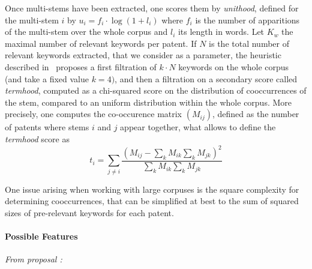 Once multi-stems have been extracted, one scores them by \emph{unithood}, defined for the multi-stem $i$ by $u_i = f_i\cdot \log{(1 + l_i)}$ where $f_i$ is the number of apparitions of the multi-stem over the whole corpus and $l_i$ its length in words. Let $K_w$ the maximal number of relevant keywords per patent. If $N$ is the total number of relevant keywords extracted, that we consider as a parameter, the heuristic described in~\cite{chavalarias2013phylomemetic} proposes a first filtration of $k\cdot N$ keywords on the whole corpus (and take a fixed value $k=4)$, and then a filtration on a secondary score called \emph{termhood}, computed as a chi-squared score on the distribution of cooccurrences of the stem, compared to an uniform distribution within the whole corpus. More precisely, one computes the co-occurence matrix $(M_{ij})$, defined as the number of patents where stems $i$ and $j$ appear together, what allows to define the \emph{termhood} score as
\[
t_i = \sum_{j\neq i}\frac{\left( M_{ij} - \sum_{k}M_{ik} \sum_{k} M_{jk}\right)^2}{\sum_{k}M_{ik} \sum_{k} M_{jk}}
\]

One issue arising when working with large corpuses is the square complexity for determining cooccurrences, that can be simplified at best to the sum of squared sizes of pre-relevant keywords for each patent.










\paragraph{Possible Features}

\textit{From proposal : }

